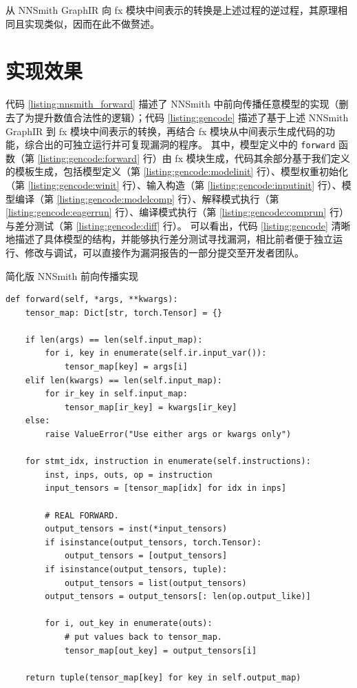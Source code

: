 从 NNSmith GraphIR 向 fx 模块中间表示的转换是上述过程的逆过程，其原理相同且实现类似，因而在此不做赘述。

\section{实现效果}

代码 \ref{listing:nnsmith_forward} 描述了 NNSmith 中前向传播任意模型的实现（删去了为提升数值合法性的逻辑）；代码 \ref{listing:gencode} 描述了基于上述 NNSmith GraphIR 到 fx 模块中间表示的转换，再结合 fx 模块从中间表示生成代码的功能，综合出的可独立运行并可复现漏洞的程序。
其中，模型定义中的 \texttt{forward} 函数（第 \ref{listing:gencode:forward} 行）由 fx 模块生成，代码其余部分基于我们定义的模板生成，包括模型定义（第 \ref{listing:gencode:modelinit} 行）、模型权重初始化（第 \ref{listing:gencode:winit} 行）、输入构造（第 \ref{listing:gencode:inputinit} 行）、模型编译（第 \ref{listing:gencode:modelcomp} 行）、解释模式执行（第 \ref{listing:gencode:eagerrun} 行）、编译模式执行（第 \ref{listing:gencode:comprun} 行）与差分测试（第 \ref{listing:gencode:diff} 行）。
可以看出，代码 \ref{listing:gencode} 清晰地描述了具体模型的结构，并能够执行差分测试寻找漏洞，相比前者便于独立运行、修改与调试，可以直接作为漏洞报告的一部分提交至开发者团队。

\begin{listing}[]
    \caption{简化版 NNSmith 前向传播实现}
    \label{listing:nnsmith_forward}
\begin{verbatim}
def forward(self, *args, **kwargs):
    tensor_map: Dict[str, torch.Tensor] = {}

    if len(args) == len(self.input_map):
        for i, key in enumerate(self.ir.input_var()):
            tensor_map[key] = args[i]
    elif len(kwargs) == len(self.input_map):
        for ir_key in self.input_map:
            tensor_map[ir_key] = kwargs[ir_key]
    else:
        raise ValueError("Use either args or kwargs only")

    for stmt_idx, instruction in enumerate(self.instructions):
        inst, inps, outs, op = instruction
        input_tensors = [tensor_map[idx] for idx in inps]

        # REAL FORWARD.
        output_tensors = inst(*input_tensors)
        if isinstance(output_tensors, torch.Tensor):
            output_tensors = [output_tensors]
        if isinstance(output_tensors, tuple):
            output_tensors = list(output_tensors)
        output_tensors = output_tensors[: len(op.output_like)]

        for i, out_key in enumerate(outs):
            # put values back to tensor_map.
            tensor_map[out_key] = output_tensors[i]
            
    return tuple(tensor_map[key] for key in self.output_map)
\end{verbatim}
\end{listing}

